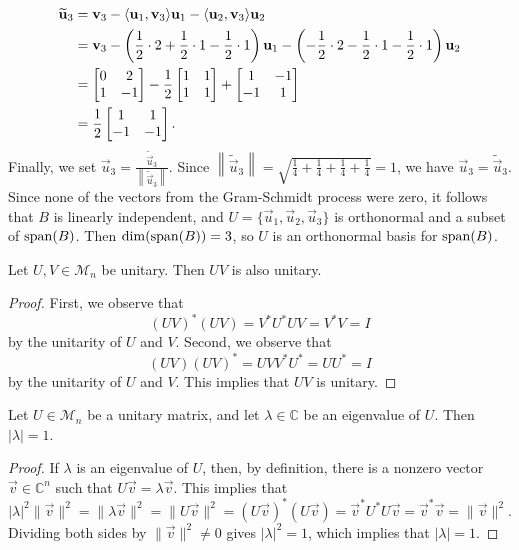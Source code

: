 \documentclass{homework}
\begin{document}
	\begin{equation*}
	\begin{aligned}
		\widetilde{\mathbf{u}}_3 &= \mathbf{v}_3 - \langle\mathbf{u}_1,\mathbf{v}_3\rangle\mathbf{u}_1 - \langle \mathbf{u}_2, \mathbf{v}_3\rangle\mathbf{u}_2 \\
		&= \mathbf{v}_3 - \left(\frac{1}{2}\cdot 2 + \frac{1}{2}\cdot 1 - \frac{1}{2}\cdot 1\right)\mathbf{u}_1 - \left(-\frac{1}{2}\cdot 2 - \frac{1}{2}\cdot 1 - \frac{1}{2}\cdot 1\right)\mathbf{u}_2\\
		&= \left[\begin{matrix}0 & 2 \\1 & -1\end{matrix}\right] - \frac{1}{2}\left[\begin{matrix}1 & 1 \\ 1 & 1\end{matrix}\right] + \left[\begin{matrix}1 & -1 \\ -1 & 1\end{matrix}\right]\\
		&= \frac{1}{2}\left[\begin{matrix}1 & 1\\ -1 & -1\end{matrix}\right].
	\end{aligned}
	\end{equation*}
	Finally, we set $\vec{u}_3 = \frac{\widetilde{\vec{u}}_3}{\left\lVert\widetilde{\vec{u}}_3\right\rVert}$. Since $\left\lVert\widetilde{\vec{u}}_3\right\rVert = \sqrt{\frac{1}{4} + \frac{1}{4} + \frac{1}{4} + \frac{1}{4}} = 1$, we have $\vec{u}_3 = \widetilde{\vec{u}}_3$. Since none of the vectors from the Gram-Schmidt process were zero, it follows that $B$ is linearly independent, and $U = \{\vec{u}_1, \vec{u}_2, \vec{u}_3\}$ is orthonormal and a subset of $\mathrm{span}(B)$. Then $\dim(\mathrm{span}(B)) = 3$, so $U$ is an orthonormal basis for $\mathrm{span}(B)$.
	
	\question Let $U, V \in \mathcal{M}_n$ be unitary. Then $UV$ is also unitary.
	
	\begin{proof}
		First, we observe that
		\begin{equation*}
			(UV)^*(UV) = V^*U^*UV = V^*V = I
		\end{equation*}
		by the unitarity of $U$ and $V$. Second, we observe that
		\begin{equation*}
			(UV)(UV)^* = UVV^*U^* = UU^* = I
		\end{equation*}
		by the unitarity of $U$ and $V$. This implies that $UV$ is unitary.
	\end{proof}
	
	\question Let $U \in \mathcal{M}_n$ be a unitary matrix, and let $\lambda \in \mathbb{C}$ be an eigenvalue of $U$. Then $|\lambda| = 1$.
	
	\begin{proof}
		If $\lambda$ is an eigenvalue of $U$, then, by definition, there is a nonzero vector $\vec{v} \in \mathbb{C}^n$ such that $U\vec{v} = \lambda \vec{v}$. This implies that
		\begin{equation*}
			|\lambda|^2\lVert\vec{v}\rVert^2 = \lVert \lambda \vec{v}\rVert^2 = \lVert U\vec{v}\rVert^2 = (U\vec{v})^*(U\vec{v}) = \vec{v}^*U^*U\vec{v} = \vec{v}^*\vec{v} = \lVert\vec{v}\rVert^2.
		\end{equation*}
		Dividing both sides by $\lVert\vec{v}\rVert^2 \ne 0$ gives $|\lambda|^2 = 1$, which implies that $|\lambda| = 1$.
	\end{proof}
	
\end{document}
